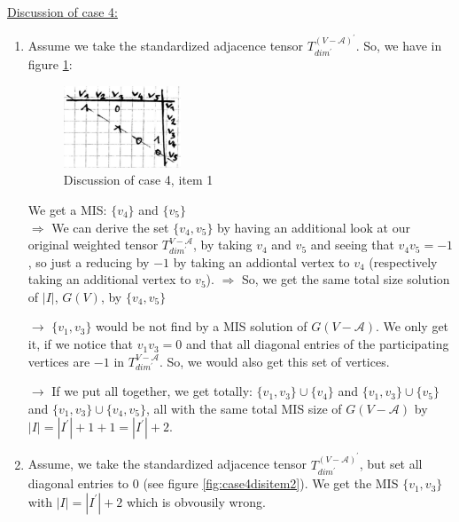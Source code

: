 \documentclass{article}
\newtheorem*{theorem A}{Theorem A}
\newtheorem*{theorem B}{N\"olker's Theorem}
\theoremstyle{remark}
\theoremstyle{remark}
\begin{document}
\vspace{0.3cm}
\underline{Discussion of case 4:}
\begin{enumerate}
    \item Assume we take the standardized adjacence tensor $T^{\left(V - \mathcal{A}\right)^{\prime}}_{dim^{\prime}}$. So, we have in figure \ref{fig:case4disitem1}:

        \begin{figure}[ht]
	        \centering
            \includegraphics[width=0.33\textwidth]{images/discussionCase4Item1.png}
	        \caption{Discussion of case 4, item 1}
	        \label{fig:case4disitem1}
        \end{figure}
    
        \vspace{0.3cm}
        We get a MIS: $\{ v_{4} \}$ and $\{ v_{5} \}$\\
        $\Rightarrow$ We can derive the set $\{ v_{4}, v_{5} \}$ by having an additional look at our original weighted tensor $T^{V - \mathcal{A}}_{dim^{\prime}}$, by taking $v_{4}$ and $v_{5}$ and seeing that $v_{4}v_{5} = - 1$, so just a reducing by $-1$ by taking an addiontal vertex to $v_{4}$ (respectively taking an additional vertex to $v_{5}$). $\Rightarrow$ So, we get the same total size solution of $|I|$, $G\left(V\right)$, by $\{ v_{4}, v_{5} \}$

        \vspace{0.3cm}
        $\rightarrow$ $\{ v_{1}, v_{3} \}$ would be not find by a MIS solution of $G\left(V - \mathcal{A}\right)$. We only get it, if we notice that $v_{1}v_{3} = 0$ and that all diagonal entries of the participating vertices are $-1$ in $T^{V - \mathcal{A}}_{dim^{\prime}}$. So, we would also get this set of vertices.

        \vspace{0.3cm}
        $\rightarrow$ If we put all together, we get totally: $\{ v_{1}, v_{3} \} \cup \{ v_{4} \}$ and $\{ v_{1}, v_{3} \} \cup \{ v_{5} \}$ and $\{ v_{1}, v_{3} \} \cup \{ v_{4}, v_{5} \}$, all with the same total MIS size of $G\left(V - \mathcal{A}\right)$ by $|I| = |I^{\prime}| + 1 + 1 = |I^{\prime}| + 2$.

    \item Assume, we take the standardized adjacence tensor $T^{\left(V - \mathcal{A}\right)^{\prime}}_{dim^{\prime}}$, but set all diagonal entries to $0$ (see figure \ref{fig:case4disitem2}). We get the MIS $\{ v_{1}, v_{3} \}$ with $|I| = |I^{\prime}| + 2$ which is obvousily wrong.


\end{enumerate}
\end{document}
